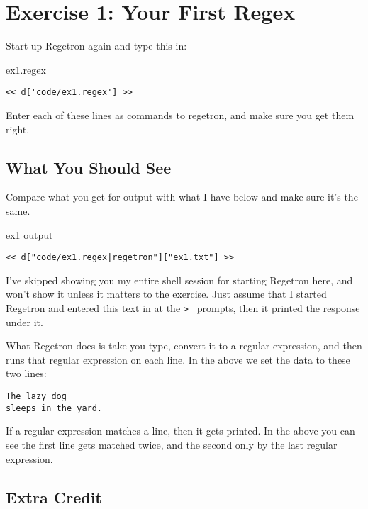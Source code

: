 \chapter{Exercise 1: Your First Regex}

Start up Regetron again and type this in:

\begin{code}{ex1.regex}
\begin{Verbatim}
<< d['code/ex1.regex'] >>
\end{Verbatim}
\end{code}

Enter each of these lines as commands to regetron, and make sure you get
them right.

\section{What You Should See}

Compare what you get for output with what I have below and
make sure it's the same.

\begin{code}{ex1 output}
\begin{Verbatim}
<< d["code/ex1.regex|regetron"]["ex1.txt"] >>
\end{Verbatim}
\end{code}

I've skipped showing you my entire shell session for starting
Regetron here, and won't show it unless it matters to the exercise.
Just assume that I started Regetron and entered this text in at the
\verb|> | prompts, then it printed the response under it.

What Regetron does is take you type, convert it to a regular expression,
and then runs that regular expression on each line.  In the above
we set the data to these two lines:

\begin{Verbatim}
The lazy dog
sleeps in the yard.
\end{Verbatim}

If a regular expression matches a line, then it gets printed.  In the
above you can see the first line gets matched twice, and the second
only by the last regular expression.

\section{Extra Credit}

